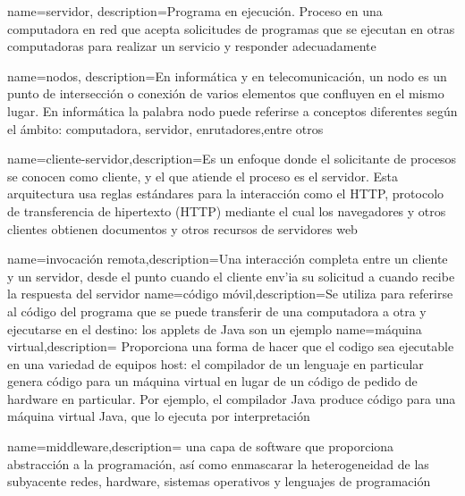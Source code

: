 

{	name=servidor,
	description={Programa en ejecución. Proceso en una computadora en red que acepta solicitudes de programas que se ejecutan en otras computadoras para realizar un servicio y responder adecuadamente }}
	
{	name=nodos,
	description={En inform\'atica y en telecomunicaci\'on, un nodo es un punto de intersecci\'on o conexi\'on  de varios elementos que confluyen en el mismo lugar. En inform\'atica la palabra nodo puede referirse a conceptos diferentes según el ámbito: computadora, servidor, enrutadores,entre otros }}
	
{name={cliente-servidor},description={Es un enfoque donde el  solicitante de procesos se conocen como cliente, y el que atiende el proceso es el servidor. Esta arquitectura usa reglas est\'andares para la interacci\'on como el HTTP, protocolo de transferencia de hipertexto (HTTP) mediante el cual los navegadores y otros clientes obtienen 	documentos y otros recursos de servidores web}}

{name={invocaci\'on remota},description={Una interacci\'on completa entre un cliente y un servidor, desde el punto	cuando el cliente env'ia su solicitud a cuando recibe la respuesta del servidor}}
{name={c\'odigo m\'ovil},description={Se utiliza para referirse al c{\'o}digo del programa 	que se puede transferir de una computadora a otra y ejecutarse en el destino: los applets de Java son un ejemplo}}
{name={m\'aquina virtual},description={ Proporciona una forma de hacer que el codigo sea ejecutable en una variedad de equipos host: el compilador de un lenguaje en particular genera c{\'o}digo para un m\'aquina virtual en lugar de un c{\'o}digo de pedido de hardware en particular. Por ejemplo, el compilador Java  produce c{\'o}digo para una m\'aquina virtual Java, que lo ejecuta por interpretaci{\'o}n}} 
			
{name={middleware},description={ una capa de software que proporciona abstracción a la programaci\'on, así como enmascarar la heterogeneidad de las subyacente redes, hardware, sistemas operativos y lenguajes de programación}} 	

